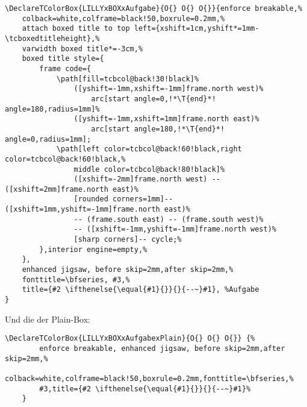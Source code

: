 {\scriptsize\begin{lstlisting}[style=latex]
\DeclareTColorBox{LILLYxBOXxAufgabe}{O{} O{} O{}}{enforce breakable,%
    colback=white,colframe=black!50,boxrule=0.2mm,%
    attach boxed title to top left={xshift=1cm,yshift*=1mm-\tcboxedtitleheight},%
    varwidth boxed title*=-3cm,%
    boxed title style={
        frame code={
            \path[fill=tcbcol@back!30!black]%
                ([yshift=-1mm,xshift=-1mm]frame.north west)%
                    arc[start angle=0,!*\T{end}*! angle=180,radius=1mm]%
                ([yshift=-1mm,xshift=1mm]frame.north east)%
                    arc[start angle=180,!*\T{end}*! angle=0,radius=1mm];
            \path[left color=tcbcol@back!60!black,right color=tcbcol@back!60!black,%
                middle color=tcbcol@back!80!black]%
                ([xshift=-2mm]frame.north west) -- ([xshift=2mm]frame.north east)%
                [rounded corners=1mm]-- ([xshift=1mm,yshift=-1mm]frame.north east)%
                -- (frame.south east) -- (frame.south west)%
                -- ([xshift=-1mm,yshift=-1mm]frame.north west)%
                [sharp corners]-- cycle;%
        },interior engine=empty,%
    },
    enhanced jigsaw, before skip=2mm,after skip=2mm,%
    fonttitle=\bfseries, #3,%
    title={#2 \ifthenelse{\equal{#1}{}}{}{--~}#1}, %Aufgabe
}
\end{lstlisting}}
Und die der Plain-Box:
{\scriptsize\begin{lstlisting}[style=latex]
\DeclareTColorBox{LILLYxBOXxAufgabexPlain}{O{} O{} O{}} {%
        enforce breakable, enhanced jigsaw, before skip=2mm,after skip=2mm,%
        colback=white,colframe=black!50,boxrule=0.2mm,fonttitle=\bfseries,%
        #3,title={#2 \ifthenelse{\equal{#1}{}}{}{--~}#1}%
    }
\end{lstlisting}}
